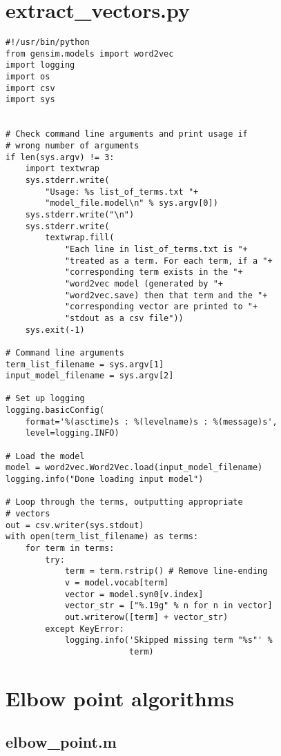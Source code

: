 \documentclass[eric_thesis.tex]{subfiles}
\begin{document}
\section{extract\_vectors.py}
\label{app:extractvectors}
\lstset{language=Python}
\begin{lstlisting}
#!/usr/bin/python
from gensim.models import word2vec
import logging
import os
import csv
import sys


# Check command line arguments and print usage if
# wrong number of arguments
if len(sys.argv) != 3:
    import textwrap
    sys.stderr.write(
        "Usage: %s list_of_terms.txt "+
        "model_file.model\n" % sys.argv[0])
    sys.stderr.write("\n")
    sys.stderr.write(
        textwrap.fill(
            "Each line in list_of_terms.txt is "+
            "treated as a term. For each term, if a "+
            "corresponding term exists in the "+
            "word2vec model (generated by "+
            "word2vec.save) then that term and the "+
            "corresponding vector are printed to "+
            "stdout as a csv file"))
    sys.exit(-1)

# Command line arguments
term_list_filename = sys.argv[1]
input_model_filename = sys.argv[2]

# Set up logging
logging.basicConfig(
    format='%(asctime)s : %(levelname)s : %(message)s', 
    level=logging.INFO)

# Load the model
model = word2vec.Word2Vec.load(input_model_filename)
logging.info("Done loading input model")

# Loop through the terms, outputting appropriate
# vectors
out = csv.writer(sys.stdout)
with open(term_list_filename) as terms:
    for term in terms:
        try:
            term = term.rstrip() # Remove line-ending
            v = model.vocab[term]
            vector = model.syn0[v.index]
            vector_str = ["%.19g" % n for n in vector]
            out.writerow([term] + vector_str)
        except KeyError:
            logging.info('Skipped missing term "%s"' % 
                         term)
\end{lstlisting}


\section{Elbow point algorithms}
\label{app:elbow_point_algorithms}
\lstset{language=Matlab}

\subsection{elbow\_point.m}
\end{document}
